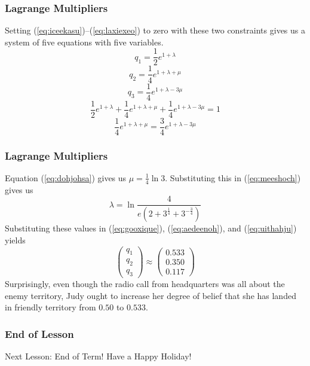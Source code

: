 \documentclass[xcolor=dvipsnames]{beamer}
\begin{document}
\begin{frame}
  \frametitle{Lagrange Multipliers}
  Setting (\ref{eq:iceekasu})--(\ref{eq:laxiexeo}) to zero with these
  two constraints gives us a system of five equations with five
  variables.
  \begin{equation}
    \label{eq:gooxique}
    q_{1}=\frac{1}{2}e^{1+\lambda}
  \end{equation}
  \begin{equation}
    \label{eq:aedeenoh}
    q_{2}=\frac{1}{4}e^{1+\lambda+\mu}
  \end{equation}
  \begin{equation}
    \label{eq:uithahju}
    q_{3}=\frac{1}{4}e^{1+\lambda-3\mu}
  \end{equation}
  \begin{equation}
    \label{eq:meeshoch}
\frac{1}{2}e^{1+\lambda}+\frac{1}{4}e^{1+\lambda+\mu}+\frac{1}{4}e^{1+\lambda-3\mu}=1
  \end{equation}
  \begin{equation}
    \label{eq:dohjohsa}
    \frac{1}{4}e^{1+\lambda+\mu}=\frac{3}{4}e^{1+\lambda-3\mu}
  \end{equation}
\end{frame}

\begin{frame}
  \frametitle{Lagrange Multipliers}
  Equation (\ref{eq:dohjohsa}) gives us $\mu=\frac{1}{4}\ln{}3$. Substituting
  this in (\ref{eq:meeshoch}) gives us
  \begin{equation}
    \label{eq:chuquohv}
    \lambda=\ln\frac{4}{e\left(2+3^{\frac{1}{4}}+3^{-\frac{3}{4}}\right)}
  \end{equation}
Substituting these values in (\ref{eq:gooxique}), (\ref{eq:aedeenoh}),
and (\ref{eq:uithahju}) yields
\begin{equation}
  \label{eq:aibigoib}
  \left(
    \begin{array}{c}
      q_{1} \\
      q_{2} \\
      q_{3}
    \end{array}\right)\approx\left(
    \begin{array}{c}
      0.533 \\
      0.350 \\
      0.117
    \end{array}\right)
\end{equation}
Surprisingly, even though the radio call from headquarters was all
about the enemy territory, Judy ought to increase her degree of belief
that she has landed in friendly territory from $0.50$ to $0.533$.
\end{frame}

\begin{frame}
  \frametitle{End of Lesson}
Next Lesson: End of Term! Have a Happy Holiday!
\end{frame}
\end{document}
